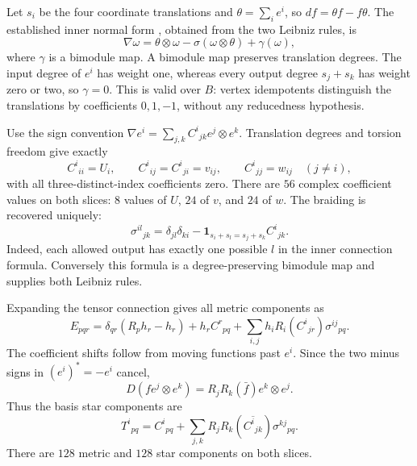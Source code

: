 \documentclass[11pt,a4paper]{article}
\theoremstyle{remark}\newtheorem{remark}[theorem]{Remark}
\begin{document}
Let \(s_i\) be the four coordinate translations and
\(\theta=\sum_i e^i\), so \(df=\theta f-f\theta\).
The established inner normal form \cite[Proposition~8.11]{orig-book},
obtained from the two Leibniz rules, is
\[
 \nabla\omega=\theta\otimes\omega
                   -\sigma(\omega\otimes\theta)+\gamma(\omega),
\]
where \(\gamma\) is a bimodule map. A bimodule map preserves translation
degrees. The input degree of \(e^i\) has weight one, whereas every output
degree \(s_j+s_k\) has weight zero or two, so \(\gamma=0\).
This is valid over \(B\): vertex idempotents distinguish the translations
by coefficients \(0,1,-1\), without any reducedness hypothesis.

Use the sign convention
\(\nabla e^i=\sum_{j,k}C^i{}_{jk}e^j\otimes e^k\).
Translation degrees and torsion freedom give exactly
\begin{equation}\label{geometry:ansatz}
 C^i{}_{ii}=U_i,\qquad
 C^i{}_{ij}=C^i{}_{ji}=v_{ij},\qquad
 C^i{}_{jj}=w_{ij}\quad(j\ne i),
\end{equation}
with all three-distinct-index coefficients zero. There are \(56\)
complex coefficient values on both slices: \(8\) values of \(U\),
\(24\) of \(v\), and \(24\) of \(w\). The braiding is recovered uniquely:
\begin{equation}\label{geometry:sigma}
 \sigma^{il}{}_{jk}
  =\delta_{jl}\delta_{ki}
    -\mathbf1_{s_i+s_l=s_j+s_k}C^i{}_{jk}.
\end{equation}
Indeed, each allowed output has exactly one possible \(l\) in the inner
connection formula. Conversely this formula is a degree-preserving
bimodule map and supplies both Leibniz rules.

Expanding the tensor connection gives all metric components as
\begin{equation}\label{geometry:metriccomponents}
 E_{pqr}=\delta_{qr}(R_ph_r-h_r)+h_rC^r{}_{pq}
       +\sum_{i,j}h_iR_i(C^i{}_{jr})\sigma^{ij}{}_{pq}.
\end{equation}
The coefficient shifts follow from moving functions past \(e^i\).
Since the two minus signs in \((e^i)^*=-e^i\) cancel,
\[
 D(f e^j\otimes e^k)=R_jR_k(\bar f)e^k\otimes e^j.
\]
Thus the basis star components are
\begin{equation}\label{geometry:starcomponents}
 T^i{}_{pq}=C^i{}_{pq}
       +\sum_{j,k}R_jR_k(\overline{C^i{}_{jk}})\sigma^{kj}{}_{pq}.
\end{equation}
There are \(128\) metric and \(128\) star components on both slices.
\end{document}
